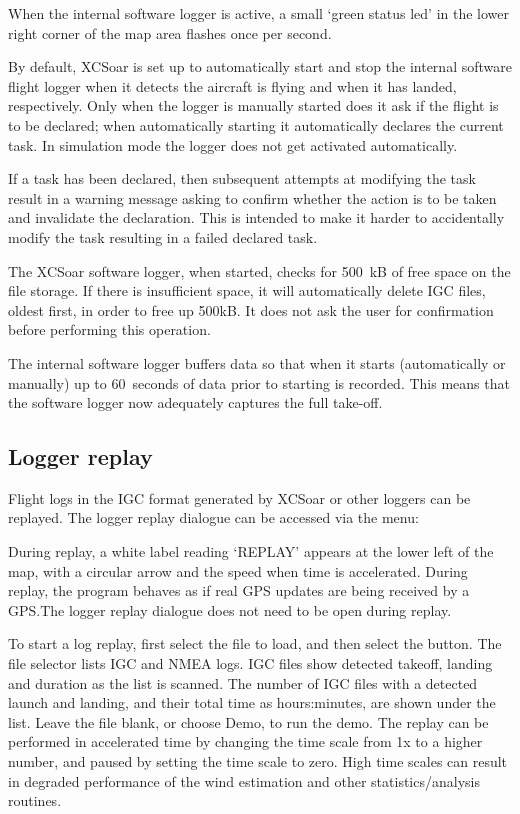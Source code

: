 When the internal software logger is active, a small `green status led' in the
lower right corner of the map area flashes once per second.

By default, XCSoar is set up to automatically start and stop the
internal software flight logger when it detects the aircraft is flying
and when it has landed, respectively.  Only when the logger is
manually started does it ask if the flight is to be declared; when
automatically starting it automatically declares the current task.
In simulation mode the logger does not get activated automatically.

If a task has been declared, then subsequent attempts at modifying the
task result in a warning message asking to confirm whether the action
is to be taken and invalidate the declaration.  This is intended to
make it harder to accidentally modify the task resulting in a failed
declared task.

The XCSoar software logger, when started, checks for 500~kB of free
space on the file storage.  If there is insufficient space, it will
automatically delete IGC files, oldest first, in order to free up
500kB.  It does not ask the user for confirmation before performing
this operation. \warning{}

The internal software logger buffers data so that when it starts
(automatically or manually) up to 60~seconds of data prior to starting
is recorded.  This means that the software logger now adequately
captures the full take-off.

\subsection*{Logger replay}\label{sec:logger-replay}
Flight logs in the IGC format generated by XCSoar or other loggers can
be replayed.  The logger replay dialogue can be accessed via the
menu:
\begin{quote}
\blink{}
\end{quote}

During replay, a white label reading `REPLAY' appears at the lower
left of the map, with a circular arrow and the speed when time is
accelerated.  During replay, the program behaves as if real GPS
updates are being received by a GPS.\@  The logger replay dialogue
does not need to be open during replay.

To start a log replay, first select the file to load, and then select the
 button.  The file selector lists IGC and NMEA logs.  IGC
files show detected takeoff, landing and duration as the list is scanned.
The number of IGC files with a detected launch and landing, and their
total time as hours:minutes, are shown under the list.
Leave the file blank, or choose Demo, to run the demo.  The replay can be
performed in accelerated time
by changing the time scale from 1x to a higher number, and paused by
setting the time scale to zero.  High time scales can result in degraded
performance of the wind estimation and other statistics/analysis routines.

